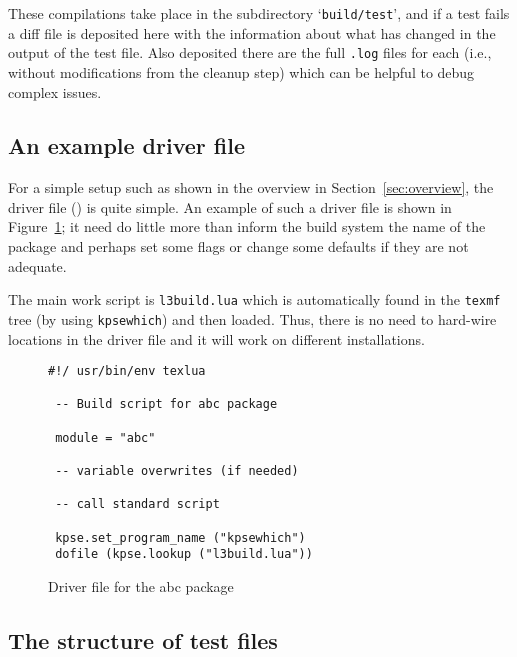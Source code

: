 \documentclass[a4paper]{ltugboat}
\begin{document}
These compilations take place in the subdirectory
`\texttt{build/test}', and if a test fails a diff file is deposited
here with the information about what has changed in the output of the
test file. Also deposited there are the full \texttt{.log} files  for each  (i.e., without modifications from the cleanup step) which can be helpful to debug complex issues.


\subsection{An example driver file}
\label{sec:example}

For a simple setup such as shown in the overview in
Section~\ref{sec:overview}, the driver file (\texttt{\drivername}) is
quite simple.  An example of such a driver file is shown in
Figure~\ref{fig:driver}; it need do little more than inform the build
system the name of the package and perhaps set some flags or change
some defaults if they are not adequate.

The main work script is \texttt{l3build.lua} which is automatically found in the
\texttt{texmf} tree (by using \texttt{kpsewhich}) and then loaded. 
Thus, there is no need to hard-wire locations in the driver file
and it will work on different installations.

\begin{figure}
\begin{Verbatim}[frame=single,fontsize=\small]
#!/ usr/bin/env texlua

 -- Build script for abc package

 module = "abc"

 -- variable overwrites (if needed)

 -- call standard script

 kpse.set_program_name ("kpsewhich")
 dofile (kpse.lookup ("l3build.lua")) 
\end{Verbatim}
\caption{Driver file for the \textsf{abc} package}
\label{fig:driver}
\end{figure}


\subsection{The structure of test files}
\end{document}
